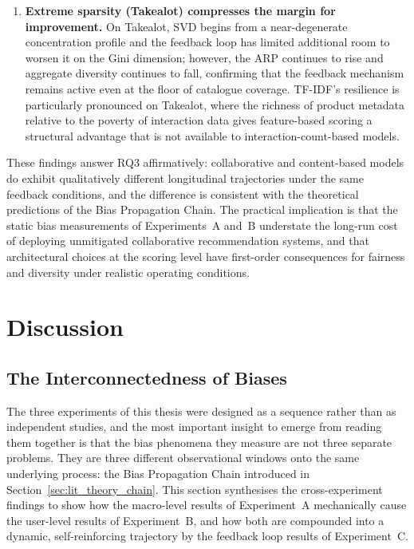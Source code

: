 \documentclass[11pt,a4paper]{report}
\begin{document}
\begin{enumerate}
    \item \textbf{Extreme sparsity (Takealot) compresses the margin for improvement.} On Takealot, SVD begins from a near-degenerate concentration profile and the feedback loop has limited additional room to worsen it on the Gini dimension; however, the ARP continues to rise and aggregate diversity continues to fall, confirming that the feedback mechanism remains active even at the floor of catalogue coverage. TF-IDF's resilience is particularly pronounced on Takealot, where the richness of product metadata relative to the poverty of interaction data gives feature-based scoring a structural advantage that is not available to interaction-count-based models.
\end{enumerate}

These findings answer RQ3 affirmatively: collaborative and content-based models do exhibit qualitatively different longitudinal trajectories under the same feedback conditions, and the difference is consistent with the theoretical predictions of the Bias Propagation Chain. The practical implication is that the static bias measurements of Experiments~A and~B understate the long-run cost of deploying unmitigated collaborative recommendation systems, and that architectural choices at the scoring level have first-order consequences for fairness and diversity under realistic operating conditions.


\chapter{Discussion}
\label{ch:discussion}

\section{The Interconnectedness of Biases}
\label{sec:disc_interconnected}

The three experiments of this thesis were designed as a sequence rather than as independent studies, and the most important insight to emerge from reading them together is that the bias phenomena they measure are not three separate problems. They are three different observational windows onto the same underlying process: the Bias Propagation Chain introduced in Section~\ref{sec:lit_theory_chain}. This section synthesises the cross-experiment findings to show how the macro-level results of Experiment~A mechanically cause the user-level results of Experiment~B, and how both are compounded into a dynamic, self-reinforcing trajectory by the feedback loop results of Experiment~C.
\end{document}
